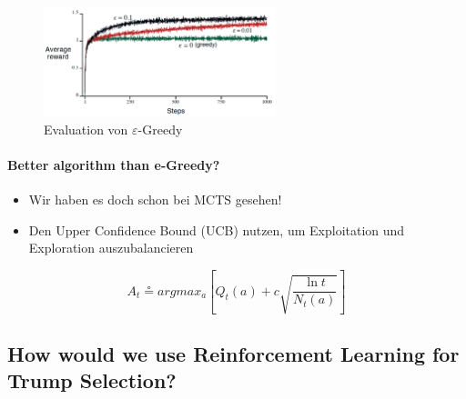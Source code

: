 \documentclass[a4paper]{article}
\begin{document}
		\begin{figure}[htb!]
			\centering
			\includegraphics[width=0.6\textwidth]{img/08_reinforcement_learning/e_greedy.png}
			\caption{Evaluation von $\varepsilon$-Greedy}
		\end{figure}
	
		\paragraph{Better algorithm than e-Greedy?}
		
		\begin{itemize}
			\item Wir haben es doch schon bei MCTS gesehen!
			\item Den Upper Confidence Bound (UCB) nutzen, um Exploitation und Exploration auszubalancieren
		\end{itemize}
	
		$$ A_t \circeq arg max_a\left[ Q_t(a) + c \sqrt{\frac{\ln t}{N_t(a)}} \right] $$
		
		\newpage
		
		\subsection{How would we use Reinforcement Learning for Trump Selection?}
		
		
	
	
	
	
\end{document}
